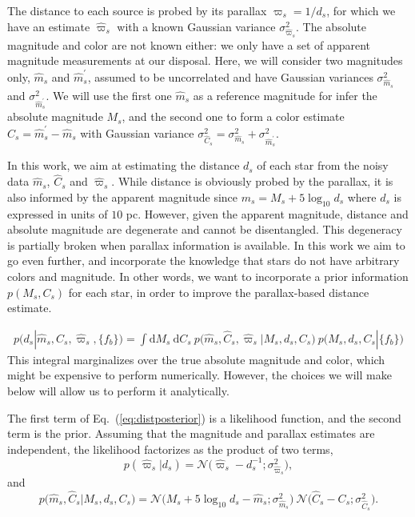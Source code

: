 \documentclass[aps,prd,showpacs,superscriptaddress,groupedaddress]{revtex4}  %
\newcommand{\equref}[1]{{\xspace}Eq.~(\ref{#1})}
\renewcommand{\d}{{\mathrm{d}}}
\newcommand{\equ}[1]{\begin{equation}#1\end{equation}}
\newcommand{\eqn}[1]{\begin{eqnarray}#1\end{eqnarray}}
\begin{document}
The distance to each source is probed by its parallax $\varpi_s=1/d_s$, for which we have an estimate $\hat{\varpi}_s$ with a known Gaussian variance $\sigma_{\hat{\varpi}_s}^2$.
The absolute magnitude and color are not known either: we only have a set of apparent magnitude measurements at our disposal. 
Here, we will consider two magnitudes only, $\hat{m}_s$ and $\hat{m}^\prime_s$, assumed to be  uncorrelated and have Gaussian variances $\sigma_{\hat{m}_s}^2$ and $\sigma_{\hat{m}^\prime_s}^2$.
We will use the first one $\hat{m}_s$ as a reference magnitude for infer the absolute magnitude $M_s$, and the second one to form a color estimate $\hat{C}_s =\hat{m}^\prime_s - \hat{m}_s $ with Gaussian variance $\sigma_{\hat{C}_s}^2 = \sigma_{\hat{m}_s}^2 + \sigma_{\hat{m}^\prime_s}^2$.

In this work, we aim at estimating the distance $d_s$ of each star from the noisy data $\hat{m}_s$,  $\hat{C}_s$ and $\hat{\varpi}_s$. 
While distance is obviously probed by the parallax, it is also informed by the apparent magnitude since $m_s = M_s + 5\log_{10} d_s$ where $d_s$ is expressed in units of $10$ pc.
However, given the apparent magnitude, distance and absolute magnitude are degenerate and cannot be disentangled. 
This degeneracy is partially broken when parallax information is available.
In this work we aim to go even further, and incorporate the knowledge that stars do not have arbitrary colors and magnitude.
In other words, we want to incorporate a prior information $p(M_s, C_s)$ for each star, in order to improve the parallax-based distance estimate. 

\eqn{
	p(d_s | \hat{m}_s, \hat{C}_s, \hat{\varpi}_s, \{ f_{b} \}) = \int \d M_s \ \d C_s \ p\bigl(\hat{m}_s, \hat{C}_s, \hat{\varpi}_s \bigr\rvert M_s, d_s, C_s\bigr) \ p\bigl( M_s, d_s, C_s | \{ f_{b} \} \bigr) \label{eq:distposterior}
}
This integral marginalizes over the true absolute magnitude and color, which might be expensive to perform numerically. 
However, the choices we will make below will allow us to perform it analytically.

The first term of \equref{eq:distposterior} is a likelihood function, and the second term is the prior. 
Assuming that the magnitude and parallax estimates are independent, the likelihood factorizes as the product of two terms, 
\equ{
	p\left(\hat{\varpi}_s \bigr\rvert d_s\right) = \mathcal{N}\bigl(\hat{\varpi}_s - d_s^{-1};\sigma_{\hat{\varpi}_s}^2 \bigr),
}
and
\equ{
	p\bigl(\hat{m}_s, \hat{C}_s \bigr\rvert M_s, d_s, C_s\bigr)  =  \mathcal{N}\bigl( M_s + 5\log_{10}d_s  -\hat{m}_s ;\sigma_{\hat{m}_s}^2 \bigr) \  \mathcal{N}\bigl(\hat{C}_s - C_s;\sigma_{\hat{C}_s}^2 \bigr).
}
\end{document}
